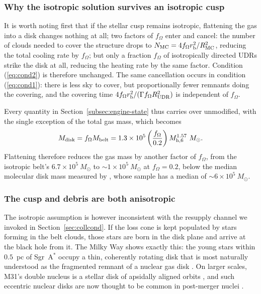 \documentclass[preprint2]{aastex}
\newcommand{\msun}{M_{\odot}\xspace}
\newcommand{\mhsix}{M_{\rm h,6}\xspace}
\begin{document}
\subsubsection{Why the isotropic solution survives an isotropic cusp}

It is worth noting first that if the stellar cusp remains isotropic, flattening the gas into a disk changes nothing at all; two factors of $f_{\Omega}$ enter and cancel: the number of clouds needed to cover the structure drops to $N_{\rm MC} = 4 f_{\Omega} r_{\rm b}^{2}/R_{\rm MC}^{2}$, reducing the total cooling rate by $f_{\Omega}$; but only a fraction $f_{\Omega}$ of isotropically directed UDRs strike the disk at all, reducing the heating rate by the same factor. Condition (\ref{eq:cond2}) is therefore unchanged. The same cancellation occurs in condition (\ref{eq:cond1}): there is less sky to cover, but proportionally fewer remnants doing the covering, and the covering time $4 f_{\Omega} r_{\rm b}^{2}/(\Gamma f_{\Omega} R_{\rm UDR}^{2})$ is independent of $f_{\Omega}$.

Every quantity in Section~\ref{subsec:engine-state} thus carries over unmodified, with the single exception of the total gas mass, which becomes
\begin{equation}
M_{\rm disk} = f_{\Omega} M_{\rm belt} = 1.3 \times 10^{5} \left(\frac{f_{\Omega}}{0.2}\right)\mhsix^{1.57}~\msun.
\end{equation}
Flattening therefore reduces the gas mass by another factor of $f_{\Omega}$, from the isotropic belt's $6.7 \times 10^{5}~\msun$ to $\sim 1 \times 10^{5}~\msun$ at $f_{\Omega} = 0.2$, below the median molecular disk mass measured by \citet{GarciaBurillo:2021a}, whose sample has a median of $\sim 6 \times 10^{5}~\msun$.

\subsubsection{The cusp and debris are both anisotropic}

The isotropic assumption is however inconsistent with the resupply channel we invoked in Section~\ref{sec:collcond}. If the loss cone is kept populated by stars forming in the belt clouds, those stars are born in the disk plane and arrive at the black hole from it. The Milky Way shows exactly this: the young stars within $0.5$~pc of Sgr~A$^{\ast}$ occupy a thin, coherently rotating disk that is most naturally understood as the fragmented remnant of a nuclear gas disk \citep{Levin:2003a,Paumard:2006a,Yelda:2014a}. On larger scales, M31's double nucleus is a stellar disk of apsidally aligned orbits \citep{Tremaine:1995a}, and such eccentric nuclear disks are now thought to be common in post-merger nuclei \citep{Madigan:2018a,Akiba:2021a}.
\end{document}
